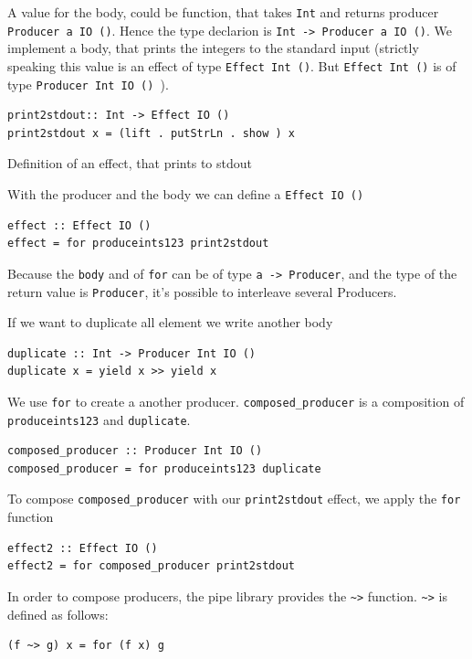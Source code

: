 A value for the body, could be function, that takes \verb|Int| and returns producer \verb|Producer a IO ()|. Hence the type declarion is \verb|Int -> Producer a IO ()|. We implement a body, that prints the integers to the standard input (strictly speaking this value is an effect of type \verb|Effect Int ()|. But \verb|Effect Int ()| is of type \verb|Producer Int IO () |).

\begin{program}
\begin{verbatim}
print2stdout:: Int -> Effect IO ()
print2stdout x = (lift . putStrLn . show ) x
\end{verbatim}
\caption{Definition of an effect, that prints to stdout}
\label{lst:stdouteffect}
\end{program}

With the producer and the body we can define a \verb|Effect IO ()|
\begin{verbatim}
effect :: Effect IO ()
effect = for produceints123 print2stdout
\end{verbatim}

Because the \verb|body| and of \verb|for| can be of type \verb|a -> Producer|, and the type of the return value is \verb|Producer|, it's possible to interleave several Producers.

If we want to duplicate all element we write another body
\begin{verbatim}
duplicate :: Int -> Producer Int IO ()
duplicate x = yield x >> yield x 
\end{verbatim}

We use \verb|for| to create a another producer. \verb|composed_producer| is a composition of \verb|produceints123| and \verb|duplicate|.
\begin{verbatim}
composed_producer :: Producer Int IO ()
composed_producer = for produceints123 duplicate
\end{verbatim}

To compose \verb|composed_producer| with our \verb|print2stdout| effect, we apply the \verb|for| function

\begin{verbatim}
effect2 :: Effect IO ()
effect2 = for composed_producer print2stdout
\end{verbatim}

In order to compose producers, the pipe library provides the \verb|~>| function. \verb|~>| is defined as follows:
\begin{verbatim}
(f ~> g) x = for (f x) g
\end{verbatim}

